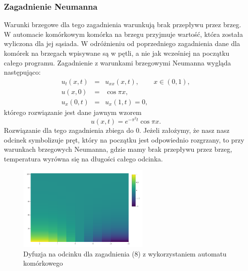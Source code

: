 \documentclass[a4paper,12pt]{article}
\begin{document}
\subsubsection{Zagadnienie Neumanna}
 Warunki brzegowe dla tego zagadnienia warunkują brak przepływu przez brzeg. W automacie komórkowym komórka na brzegu przyjmuje wartość, która została wyliczona dla jej sąsiada. W odróżnieniu od poprzedniego zagadnienia dane dla komórek na brzegach wpisywane są w pętli, a nie jak wcześniej na początku całego programu.
 Zagadnienie z warunkami brzegowymi Neumanna wygląda następująco:
\begin{equation}
    \begin{array}{llll}
    u_t(x,t)&=&u_{xx}(x,t),&x\in(0,1),\\
    u(x,0)&=&\cos\pi x,\\
    u_x(0,t)&=&u_x(1,t)=0,
    \end{array}
\end{equation}
którego rozwiązanie jest dane jawnym wzorem $$u(x,t) = e^{-\pi^2t}\cos\pi x.$$
Rozwiązanie dla tego zagadnienia zbiega do 0. Jeżeli założymy, że nasz nasz odcinek symbolizuje pręt, który na początku jest odpowiednio rozgrzany, to przy warunkach brzegowych Neumanna, gdzie mamy brak przepływu przez brzeg, temperatura wyrówna się na długości całego odcinka.
\begin{figure}[!htb]
    \centering
    \includegraphics[width=6.5cm]{dyfuzjan.png}
    \caption{Dyfuzja na odcinku dla zagadnienia (8) z wykorzystaniem automatu komórkowego}
    \label{fig:my_label}
\end{figure}
\newpage
\end{document}
